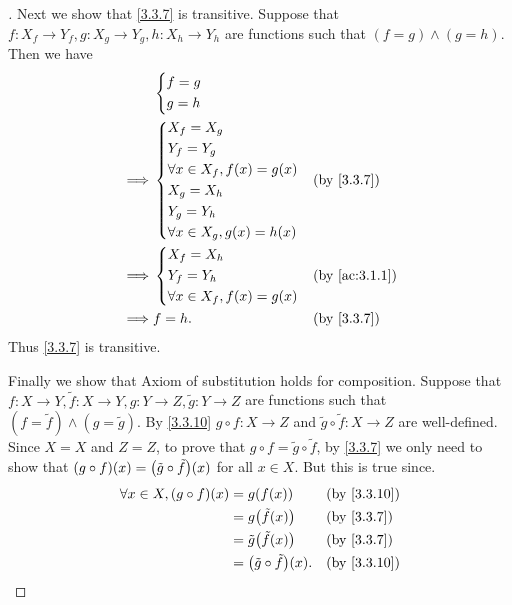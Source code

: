 \begin{proof}[]
  Next we show that \cref{3.3.7} is transitive.
  Suppose that \(f : X_f \to Y_f, g : X_g \to Y_g, h : X_h \to Y_h\) are functions such that \((f = g) \land (g = h)\).
  Then we have
  \begin{align*}
             & \begin{dcases}
                 f = g \\
                 g = h
               \end{dcases}                                     \\
    \implies & \begin{dcases}
                 X_f = X_g                      \\
                 Y_f = Y_g                      \\
                 \forall x \in X_f, f(x) = g(x) \\
                 X_g = X_h                      \\
                 Y_g = Y_h                      \\
                 \forall x \in X_g, g(x) = h(x)
               \end{dcases} &  & \by{3.3.7}                    \\
    \implies & \begin{dcases}
                 X_f = X_h \\
                 Y_f = Y_h \\
                 \forall x \in X_f, f(x) = g(x)
               \end{dcases}    &  & \by{ac:3.1.1}                \\
    \implies & f = h.                            &  & \by{3.3.7}
  \end{align*}
  Thus \cref{3.3.7} is transitive.

  Finally we show that Axiom of substitution holds for composition.
  Suppose that \(f : X \to Y, \tilde{f} : X \to Y, g : Y \to Z, \tilde{g} : Y \to Z\) are functions such that \((f = \tilde{f}) \land (g = \tilde{g})\).
  By \cref{3.3.10} \(g \circ f : X \to Z\) and \(\tilde{g} \circ \tilde{f} : X \to Z\) are well-defined.
  Since \(X = X\) and \(Z = Z\), to prove that \(g \circ f = \tilde{g} \circ \tilde{f}\), by \cref{3.3.7} we only need to show that \((g \circ f)(x) = \pa{\tilde{g} \circ \tilde{f}}(x)\) for all \(x \in X\).
  But this is true since.
  \begin{align*}
    \forall x \in X, (g \circ f)(x) & = g(f(x))                            &  & \by{3.3.10} \\
                                    & = g\pa{\tilde{f}(x)}                 &  & \by{3.3.7}  \\
                                    & = \tilde{g}\pa{\tilde{f}(x)}         &  & \by{3.3.7}  \\
                                    & = \pa{\tilde{g} \circ \tilde{f}}(x). &  & \by{3.3.10}
  \end{align*}
\end{proof}

